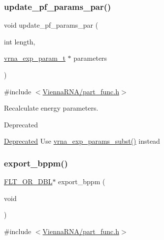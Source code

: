 \subsubsection{\texorpdfstring{update\+\_\+pf\+\_\+params\+\_\+par()}{update\_pf\_params\_par()}}
{\footnotesize\ttfamily void update\+\_\+pf\+\_\+params\+\_\+par (\begin{DoxyParamCaption}\item[{int}]{length,  }\item[{\hyperlink{group__energy__parameters_ga01d8b92fe734df8d79a6169482c7d8d8}{vrna\+\_\+exp\+\_\+param\+\_\+t} $\ast$}]{parameters }\end{DoxyParamCaption})}



{\ttfamily \#include $<$\hyperlink{part__func_8h}{Vienna\+R\+N\+A/part\+\_\+func.\+h}$>$}



Recalculate energy parameters. 

\begin{DoxyRefDesc}{Deprecated}
\item[\hyperlink{deprecated__deprecated000106}{Deprecated}]Use \hyperlink{group__energy__parameters_ga8e7ac4fab3b0cc03afbc134eaafb3525}{vrna\+\_\+exp\+\_\+params\+\_\+subst()} instead\end{DoxyRefDesc}
\mbox{\label{group__pf__fold_gac5ac7ee281aae1c5cc5898a841178073}} 
\subsubsection{\texorpdfstring{export\+\_\+bppm()}{export\_bppm()}}
{\footnotesize\ttfamily \hyperlink{group__data__structures_ga31125aeace516926bf7f251f759b6126}{F\+L\+T\+\_\+\+O\+R\+\_\+\+D\+BL}$\ast$ export\+\_\+bppm (\begin{DoxyParamCaption}\item[{void}]{ }\end{DoxyParamCaption})}



{\ttfamily \#include $<$\hyperlink{part__func_8h}{Vienna\+R\+N\+A/part\+\_\+func.\+h}$>$}



